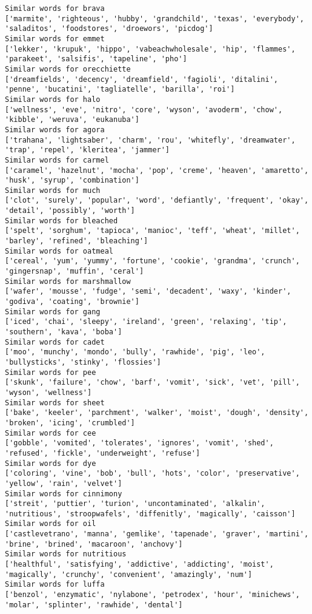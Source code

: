 \documentclass[11pt]{article}
\begin{document}
\begin{Verbatim}[commandchars=\\\{\}]
Similar words for brava
['marmite', 'righteous', 'hubby', 'grandchild', 'texas', 'everybody', 'saladitos', 'foodstores', 'droewors', 'picdog']
Similar words for emmet
['lekker', 'krupuk', 'hippo', 'vabeachwholesale', 'hip', 'flammes', 'parakeet', 'salsifis', 'tapeline', 'pho']
Similar words for orecchiette
['dreamfields', 'decency', 'dreamfield', 'fagioli', 'ditalini', 'penne', 'bucatini', 'tagliatelle', 'barilla', 'roi']
Similar words for halo
['wellness', 'eve', 'nitro', 'core', 'wyson', 'avoderm', 'chow', 'kibble', 'weruva', 'eukanuba']
Similar words for agora
['trahana', 'lightsaber', 'charm', 'rou', 'whitefly', 'dreamwater', 'trap', 'repel', 'kleritea', 'jammer']
Similar words for carmel
['caramel', 'hazelnut', 'mocha', 'pop', 'creme', 'heaven', 'amaretto', 'husk', 'syrup', 'combination']
Similar words for much
['clot', 'surely', 'popular', 'word', 'defiantly', 'frequent', 'okay', 'detail', 'possibly', 'worth']
Similar words for bleached
['spelt', 'sorghum', 'tapioca', 'manioc', 'teff', 'wheat', 'millet', 'barley', 'refined', 'bleaching']
Similar words for oatmeal
['cereal', 'yum', 'yummy', 'fortune', 'cookie', 'grandma', 'crunch', 'gingersnap', 'muffin', 'ceral']
Similar words for marshmallow
['wafer', 'mousse', 'fudge', 'semi', 'decadent', 'waxy', 'kinder', 'godiva', 'coating', 'brownie']
Similar words for gang
['iced', 'chai', 'sleepy', 'ireland', 'green', 'relaxing', 'tip', 'southern', 'kava', 'boba']
Similar words for cadet
['moo', 'munchy', 'mondo', 'bully', 'rawhide', 'pig', 'leo', 'bullysticks', 'stinky', 'flossies']
Similar words for pee
['skunk', 'failure', 'chow', 'barf', 'vomit', 'sick', 'vet', 'pill', 'wyson', 'wellness']
Similar words for sheet
['bake', 'keeler', 'parchment', 'walker', 'moist', 'dough', 'density', 'broken', 'icing', 'crumbled']
Similar words for cee
['gobble', 'vomited', 'tolerates', 'ignores', 'vomit', 'shed', 'refused', 'fickle', 'underweight', 'refuse']
Similar words for dye
['coloring', 'vine', 'bob', 'bull', 'hots', 'color', 'preservative', 'yellow', 'rain', 'velvet']
Similar words for cinnimony
['streit', 'puttier', 'turion', 'uncontaminated', 'alkalin', 'nutritious', 'stroopwafels', 'diffenitly', 'magically', 'caisson']
Similar words for oil
['castlevetrano', 'manna', 'gemlike', 'tapenade', 'graver', 'martini', 'brine', 'brined', 'macaroon', 'anchovy']
Similar words for nutritious
['healthful', 'satisfying', 'addictive', 'addicting', 'moist', 'magically', 'crunchy', 'convenient', 'amazingly', 'num']
Similar words for luffa
['benzol', 'enzymatic', 'nylabone', 'petrodex', 'hour', 'minichews', 'molar', 'splinter', 'rawhide', 'dental']

\end{Verbatim}
\end{document}
